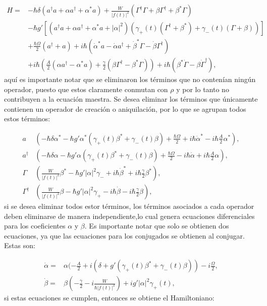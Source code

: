 \documentclass[a4paper,10pt]{report}
\begin{document}
\begin{align*}
H =& -\hbar \delta(a^{\dagger}a +\alpha a^{\dagger}+\alpha^* a)+\frac{W}{|f(t)|^2}(\Gamma^{\dagger}\Gamma + \beta \Gamma^{\dagger} + \beta^* \Gamma)\\
 &-\hbar g'[(a^{\dagger}a +\alpha a^{\dagger}+\alpha^* a + |\alpha|^2)(\gamma_+(t)(\Gamma^{\dagger}+\beta^*)+\gamma_-(t)(\Gamma+\beta))]\\
 &+\frac{\hbar \Omega}{2}(a^{\dagger} + a)+i\hbar(\dot{\alpha}^*a-\dot{\alpha}a^\dagger+\dot{\beta}^*\Gamma-\dot{\beta}\Gamma^\dagger)\\
 &+i\hbar(\frac{A}{2}(\alpha a^\dagger - \alpha^*a)+\frac{\gamma}{2}(\beta\Gamma^{\dagger}-\beta^* \Gamma))+i\hbar(\beta^*\dot{\Gamma} - \beta \dot{\Gamma}^\dagger),
\end{align*} aquí es importante notar que se eliminaron los términos que no contenían ningún operador, puesto que estos claramente conmutan con $\rho$ y por lo tanto no contribuyen a la ecuación maestra. Se desea eliminar los términos que únicamente contienen un operador de creación o aniquilación, por lo que se agrupan todos estos términos: 

\begin{align}
a&(-\hbar\delta\alpha^* -\hbar g' \alpha^*(\gamma_+(t) \beta^* + \gamma_-(t) \beta)+ \frac{\hbar\Omega}{2} + i\hbar\dot{\alpha}^* -i\hbar\frac{A}{2}\alpha^*),\\
a^\dagger&(-\hbar\delta\alpha -\hbar g' \alpha(\gamma_+(t) \beta^* + \gamma_-(t) \beta)+ \frac{\hbar\Omega}{2} - i\hbar\dot{\alpha} +i\hbar\frac{A}{2}\alpha),\\
\Gamma&(\frac{W}{|f(t)|^2}\beta^*-\hbar g'|\alpha|^2\gamma_- +  i\hbar\dot{\beta}^*+i\hbar\frac{\gamma}{2}\beta^*),\\
\Gamma^\dagger&(\frac{W}{|f(t)|^2}\beta-\hbar g'|\alpha|^2\gamma_+ -  i\hbar\dot{\beta}-i\hbar\frac{\gamma}{2}\beta),
\end{align} si se desea eliminar todos estor términos, los términos asociados a cada operador deben eliminarse de manera independiente,lo cual genera ecuaciones diferenciales para los coeficientes $\alpha$ y $\beta$. Es importante notar que solo se obtienen dos ecuaciones, ya que las ecuaciones para los conjugados se obtienen al conjugar. Estas son:

\begin{align}
\dot{\alpha} =& \alpha(-\frac{A}{2}+i(\delta+g'(\gamma_+(t) \beta^* + \gamma_-(t) \beta))-i\frac{\Omega}{2},\\
\dot{\beta} =& \beta(-\frac{\gamma}{2}-i\frac{W}{\hbar|f(t)|^2})+ig'|\alpha|^2\gamma_+(t),
\end{align} si estas ecuaciones se cumplen, entonces se obtiene el Hamiltoniano:
\end{document}
